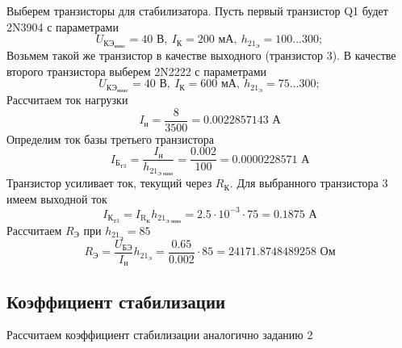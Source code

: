 \documentclass[a4paper, 12pt]{article}
\begin{document}
    Выберем транзисторы для стабилизатора. Пусть первый транзистор Q1 будет 2N3904 с параметрами
    $$
    U_{\text{КЭ}_\text{макс}}=40\text{ В},\ I_\text{К}=200\text{ мА},\ h_{21_\text{Э}}=100...300;
    $$
    Возьмем такой же транзистор в качестве выходного (транзистор 3). В качестве второго транзистора
    выберем 2N2222 с параметрами
    $$
    U_{\text{КЭ}_\text{макс}}=40\text{ В},\ I_\text{К}=600\text{ мА},\ h_{21_\text{Э}}=75...300;
    $$
    Рассчитаем ток нагрузки
    $$
    I_\text{н}=\dfrac{8}{3500}=0.0022857143\text{ А}
    $$
    Определим ток базы третьего транзистора
    $$
    I_{\text{Б}_\text{Т3}}=\dfrac{I_\text{н}}{h_{21_\text{Э мин}}}=\dfrac{0.002}{100}=0.0000228571\text{ А}
    $$
    Транзистор усиливает ток, текущий через $R_\text{К}$. Для выбранного транзистора 3 имеем выходной ток
    $$
    I_{\text{К}_\text{Т3}}=I_{\text{R}_\text{К}}h_{21_\text{Э мин}}=2.5\cdot10^{-3}\cdot75=0.1875\text{ А}
    $$
    Рассчитаем $R_\text{Э}$ при $h_{21_\text{Э}}=85$
    $$
    R_\text{Э}=\dfrac{U_\text{БЭ}}{I_\text{н}}h_{21_\text{Э}}=\dfrac{0.65}{0.002}\cdot85=24171.8748489258\text{ Ом}
    $$


    \subsection{Коэффициент стабилизации}
    Рассчитаем коэффициент стабилизации аналогично заданию 2
\end{document}

